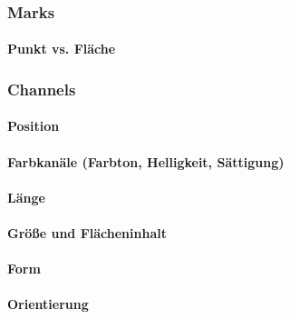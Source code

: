             \subsubsection{Marks} %

                \paragraph{Punkt vs. Fläche} %

            \subsubsection{Channels} %

                \paragraph{Position} %

                \paragraph{Farbkanäle (Farbton, Helligkeit, Sättigung)} %

                \paragraph{Länge} %

                \paragraph{Größe und Flächeninhalt} %

                \paragraph{Form} %

                \paragraph{Orientierung} %

